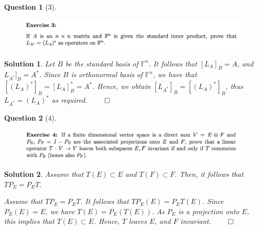 \documentclass{article} %
\theoremstyle{quest}
\newtheorem*{question}{Question}
\newtheorem*{solution}{Solution}
\begin{document}
\bigskip

\begin{question}[3]
\hfill
\begin{figure}[h!]
  \centering
    \includegraphics[width=1\textwidth]{LA-3-3.png}
\end{figure}
\end{question}
\begin{solution}
Let $B$ be the standard basis of $\mathbb{F}^n$. It follows that $[L_{A}]_{B} = A$,
and $L_{A^*}]_{B} = A^*$.  
Since $B$ is orthonormal basis of $\mathbb{F}^n$, we have that $[(L_{A})^*]_{B} = [L_{A}]_{B}^* = A^*$.
Hence, we obtain $[L_{A^*}]_{B} = [(L_{A})^*]_{B}$, thus $L_{A^*} = (L_{A})^*$ as required. 
\hfill $\qed$

\end{solution}

\bigskip

\begin{question}[4]
\hfill
\begin{figure}[h!]
  \centering
    \includegraphics[width=1\textwidth]{LA-3-4.png}
\end{figure}
\end{question}
\begin{solution}
Assume that $T(E) \subset E$ and $T(F) \subset F$. Then, it follows that
$T P_{E} = P_{E} T$. 

\smallskip

Assume that $T P_{E} = P_{E} T$. It follows that
$T P_{E}(E) = P_{E} T (E)$. Since $P_{E}(E) = E$, we have $T(E) = P_{E}(T(E))$. As $P_{E}$ is a projection
onto $E$, this implies that $T(E) \subset E$. Hence, $T$ leaves $E$, and $F$ invariant. 
\hfill $\qed$ 
\end{solution}

\newpage
\end{document}
